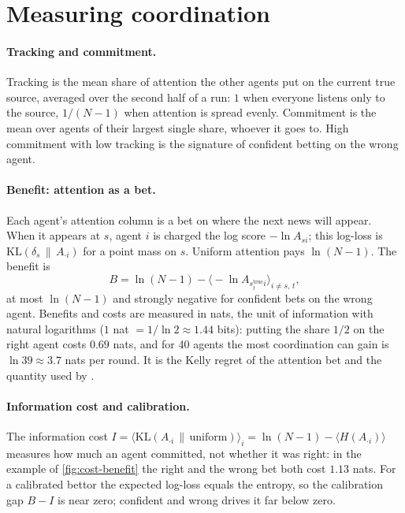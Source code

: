 \section{Measuring coordination}\label{sec:measures}

\paragraph{Tracking and commitment.} Tracking is the mean share of attention the other agents put on the current true
source, averaged over the second half of a run: $1$ when everyone listens only to the source, $1/(N-1)$ when attention
is spread evenly. Commitment is the mean over agents of their largest single share, whoever it goes to. High commitment
with low tracking is the signature of confident betting on the wrong agent.

\paragraph{Benefit: attention as a bet.} Each agent's attention column is a bet on where the next news will appear.
When it appears at $s$, agent $i$ is charged the log score $-\ln A_{si}$; this log-loss is $\mathrm{KL}(\delta_s\,\|\,A_{\cdot
i})$ for a point mass on $s$. Uniform attention pays $\ln(N-1)$. The benefit is
\begin{equation}
  B=\ln(N-1)-\Big\langle -\ln A_{s_t^{\mathrm{true}} i}\Big\rangle_{i\ne s,\,t},
\end{equation}
at most $\ln(N-1)$ and strongly negative for confident bets on the wrong agent. Benefits and costs are measured in nats, the unit of information with natural logarithms
($1$ nat $=1/\ln 2\approx1.44$ bits): putting the share $1/2$ on the right agent costs $0.69$ nats, and for 40 agents
the most coordination can gain is $\ln 39\approx3.7$ nats per round. It is the Kelly regret of the attention
bet and the quantity used by \citet{lee2024constructing}.

\paragraph{Information cost and calibration.} The information cost
$I=\langle\mathrm{KL}(A_{\cdot i}\,\|\,\mathrm{uniform})\rangle_i=\ln(N-1)-\langle H(A_{\cdot i})\rangle$ measures how much
an agent committed, not whether it was right: in the example of \cref{fig:cost-benefit} the right and the wrong bet both
cost $1.13$ nats. For a calibrated bettor the expected log-loss equals the entropy, so the calibration gap $B-I$ is near
zero; confident and wrong drives it far below zero.

